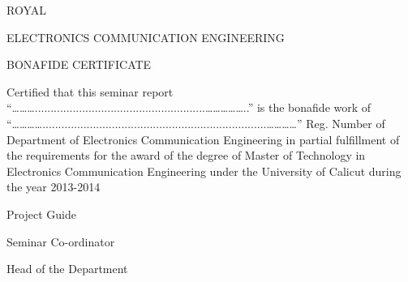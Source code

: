 \newpage

\thispagestyle{empty}

	
\vspace*{1cm}

\begin{center}
	\fontsize{16}{12}\MakeUppercase{Royal}
\end{center}

\vspace*{0.75cm}

\begin{center}
	\fontsize{14}{12}\MakeUppercase{Electronics Communication Engineering}
\end{center}

\vspace*{0.5cm}

\begin{center}
	\fontsize{14}{12}\MakeUppercase{BONAFIDE CERTIFICATE}\\
\end{center}


\begin{doublespace}
Certified that this seminar report “………......................................................……………..” is the bonafide work of “………….......................................................................…………” Reg. Number of Department of Electronics Communication Engineering in partial fulfillment of the requirements for the award of the degree of Master of Technology in Electronics Communication Engineering under the University of Calicut during the year 2013-2014
\end{doublespace}

\vspace{0.75cm}

\noindent
\begin{minipage}[t]{0.33\linewidth}
	\begin{flushleft}
		Project Guide
	\end{flushleft}
\end{minipage}
\hfill
\noindent
\begin{minipage}[t]{0.33\linewidth}
	\begin{flushleft}
		Seminar Co-ordinator
	\end{flushleft}
\end{minipage}
\hfill
\noindent
\begin{minipage}[t]{0.33\linewidth}
	\begin{flushleft}
		Head of the Department
	\end{flushleft}
\end{minipage}


